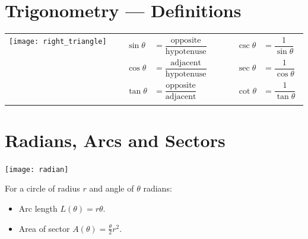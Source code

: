 \section{Trigonometry --- Definitions}\label{sec_A_3}
\begin{center}
\begin{tabular}{m{6cm}cm{8cm}}
  \texttt{[image: right\_triangle]} & \qquad&
$
\begin{array}{rlcrl}
\sin\theta &= \dfrac{\text{opposite}}{\text{hypotenuse}} & \qquad & \csc \theta &= \dfrac{1}{\sin\theta} \\[3ex]
\cos\theta &= \dfrac{\text{adjacent}}{\text{hypotenuse}} & \qquad & \sec \theta &= \dfrac{1}{\cos\theta} \\[3ex]
\tan\theta &= \dfrac{\text{opposite}}{\text{adjacent}} & \qquad & \cot \theta &= \dfrac{1}{\tan\theta}
\end{array}
$
\end{tabular}
\end{center}
\section{Radians, Arcs and Sectors}\label{app rad arc sec}
\begin{center}
 \texttt{[image: radian]}
\end{center}
For a circle of radius $r$ and angle of $\theta$ radians:
\begin{itemize}
 \item Arc length $L(\theta) = r \theta$.
 \item Area of sector $A(\theta) = \frac{\theta}{2} r^2$.
\end{itemize}


